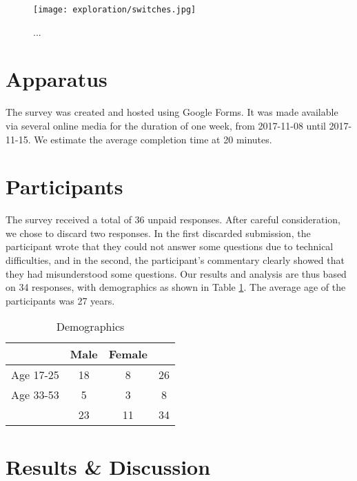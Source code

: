 \begin{figure}
    \centering
    \texttt{[image: exploration/switches.jpg]}
    \caption{...}
    \label{fig:explor:switches}
\end{figure}

\section{Apparatus} \label{sec:explor:apparatus}
The survey was created and hosted using Google Forms. It was made available via several online media for the duration of one week, from 2017-11-08 until 2017-11-15. We estimate the average completion time at 20 minutes.

\section{Participants} \label{subsec:explor:participants}
The survey received a total of 36 unpaid responses. After careful consideration, we chose to discard two responses. In the first discarded submission, the participant wrote that they could not answer some questions due to technical difficulties, and in the second, the participant's commentary clearly showed that they had misunderstood some questions. Our results and analysis are thus based on 34 responses, with demographics as shown in Table \ref{table:explor:demographics}. The average age of the participants was 27 years.

    \begin{table}
    \centering
        \begin{tabular}{|c|c c|c|} 
        \hline
                  & Male & Female &    \\
        \hline
        Age 17-25 &   18 &      8 & 26 \\
        Age 33-53 &    5 &      3 &  8 \\
        \hline
                  &   23 &     11 & 34 \\
        \hline
        \end{tabular}
    \caption{Demographics}
    \label{table:explor:demographics}
    \end{table}

\section{Results \& Discussion} \label{sec:explor:res_disc}

